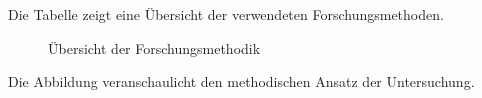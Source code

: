 Die Tabelle zeigt eine Übersicht der verwendeten Forschungsmethoden.

\begin{figure}[htbp]
\centering
\caption{Übersicht der Forschungsmethodik}
\label{fig:methodik}
\end{figure}

Die Abbildung veranschaulicht den methodischen Ansatz der Untersuchung.

